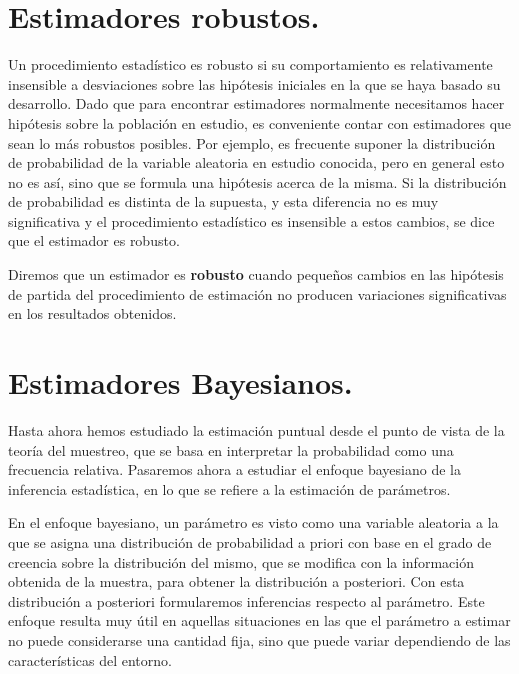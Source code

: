 \section{Estimadores robustos.}

Un procedimiento estad\'istico es robusto si su comportamiento es relativamente insensible a desviaciones sobre las hip\'otesis iniciales en la que se haya basado su desarrollo. Dado que para encontrar estimadores normalmente necesitamos hacer hip\'otesis sobre la poblaci\'on en estudio, es conveniente contar con estimadores que sean lo m\'as robustos posibles. Por ejemplo, es frecuente suponer la distribuci\'on de probabilidad de la variable aleatoria en estudio conocida, pero en general esto no es as\'i, sino que se formula una hip\'otesis acerca de la misma. Si la distribuci\'on de probabilidad es distinta de la supuesta, y esta diferencia no es muy significativa y el procedimiento estad\'istico es insensible a estos cambios, se dice que el estimador es robusto.

\begin{definicion}
Diremos que un estimador es \textbf{robusto} cuando peque\~nos cambios en las hip\'otesis de partida del procedimiento de estimaci\'on no producen variaciones significativas en los resultados obtenidos.
\end{definicion}

\section{Estimadores Bayesianos.}

Hasta ahora hemos estudiado la estimaci\'on puntual desde el punto de vista de la teor\'ia del muestreo, que se basa en interpretar la probabilidad como una frecuencia relativa. Pasaremos ahora a estudiar el enfoque bayesiano de la inferencia estad\'istica, en lo que se refiere a la estimaci\'on de par\'ametros.

En el enfoque bayesiano, un par\'ametro es visto como una variable aleatoria a la que se asigna una distribuci\'on de probabilidad a priori con base en el grado de creencia sobre la distribuci\'on del mismo, que se modifica con la informaci\'on obtenida de la muestra, para obtener la distribuci\'on a posteriori. Con esta distribuci\'on a posteriori formularemos inferencias respecto al par\'ametro. Este enfoque resulta muy \'util en aquellas situaciones en las que el par\'ametro a estimar no puede considerarse una cantidad fija, sino que puede variar dependiendo de las caracter\'isticas del entorno.

